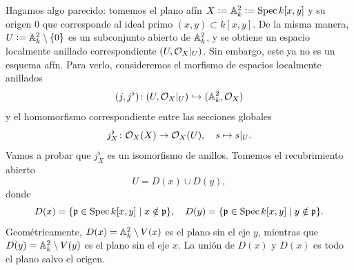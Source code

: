 \documentclass{article}
\numberwithin{equation}{section}
\theoremstyle{definition}
\begin{document}
\begin{ejemplo}
  \label{ejemplo:plano-sin-origen}
  Hagamos algo parecido: tomemos el plano afín
  $X \dfn \AA^2_k \dfn \Spec k [x,y]$ y su origen $0$ que corresponde al ideal
  primo $(x,y) \subset k [x,y]$. De la misma manera,
  $U \dfn \AA^2_k \setminus \{ 0 \}$ es un subconjunto abierto de $\AA^2_k$,
  y se obtiene un espacio localmente anillado correspondiente
  $(U, \O_X|_U)$. Sin embargo, este ya no es un esquema afín. Para verlo,
  consideremos el morfismo de espacios localmente anillados
  $$(j,j^\flat)\colon (U, \O_X|_U) \hookrightarrow (\AA^2_k, \O_X)$$
  y el homomorfismo correspondiente entre las secciones globales
  $$j^\flat_X\colon \O_X (X) \to \O_X (U), \quad s \mapsto s|_U.$$
  Vamos a probar que $j^\flat_X$ es un isomorfismo de anillos. Tomemos
  el recubrimiento abierto
  $$U = D (x) \cup D (y),$$
  donde
  \[ D (x) = \{ \mathfrak{p} \in \Spec k [x,y] \mid x \notin \mathfrak{p} \},
     \quad
     D (y) = \{ \mathfrak{p} \in \Spec k [x,y] \mid y \notin \mathfrak{p} \}. \]
  Geométricamente, $D (x) = \AA^2_k \setminus V (x)$ es el plano sin el eje $y$,
  mientras que $D (y) = \AA^2_k \setminus V (y)$ es el plano sin el eje $x$.
  La unión de $D (x)$ y $D (x)$ es todo el plano salvo el origen.


\end{ejemplo}
\end{document}
